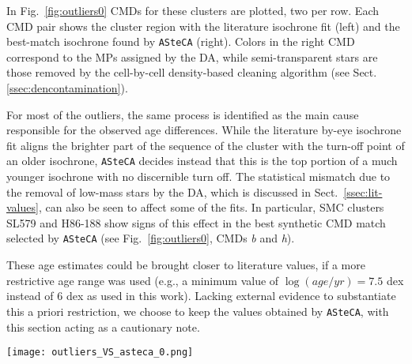 \documentclass{aa}
\begin{document}
\begin{appendix}
In Fig.~\ref{fig:outliers0} CMDs for these clusters are plotted, two per row.
Each CMD pair shows the cluster region with the literature isochrone fit (left)
and the best-match isochrone found by \texttt{ASteCA} (right).
%
Colors in the right CMD correspond to the MPs assigned by the DA, while
semi-transparent stars are those removed by the cell-by-cell density-based
cleaning algorithm (see Sect.\ref{ssec:dencontamination}).
%

For most of the outliers, the same process is identified as the main
cause responsible for the observed age differences.
While the literature by-eye isochrone fit aligns the brighter
part of the sequence of the cluster with the turn-off point of an older
isochrone, \texttt{ASteCA} decides instead that this is the top portion of a
much younger isochrone with no discernible turn off.
%
The statistical mismatch due to the removal of low-mass stars by the DA,
which is discussed in Sect.~\ref{ssec:lit-values}, can also be seen to affect some
of the fits. In particular, SMC clusters SL579 and H86-188 show signs of
this effect in the best synthetic CMD match selected by \texttt{ASteCA}
(see Fig.~\ref{fig:outliers0}, CMDs \emph{b} and \emph{h}).

These age estimates could be brought closer to literature values, if a more
restrictive age range was used (e.g., a minimum value of $\log(age/yr){=}7.5$
dex instead of 6 dex as used in this work).
Lacking external evidence to substantiate this a priori restriction, we choose
to keep the values obtained by \texttt{ASteCA}, with this section acting as a
cautionary note.

\begin{figure*}
\texttt{[image: outliers\_VS\_asteca\_0.png]}
\caption{CMDs for the outliers set. Description of the plots in the main
text of the section.}
\label{fig:outliers0}
\end{figure*}






\end{appendix}
\end{document}
